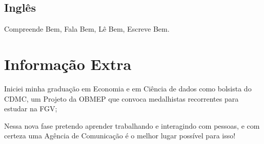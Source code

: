 \documentclass[letterpaper]{twentysecondcv} %
\begin{document}
\subsection{Inglês}{Compreende Bem, Fala Bem, Lê Bem, Escreve Bem.}




\section{Informação Extra}

Iniciei minha graduação em Economia e em Ciência de dados como bolsista do CDMC, um Projeto da OBMEP que convoca medalhistas recorrentes para estudar na FGV; 

Nessa nova fase pretendo aprender trabalhando e interagindo com pessoas, e com certeza uma Agência de Comunicação é o melhor lugar possível para isso!





\end{document}

